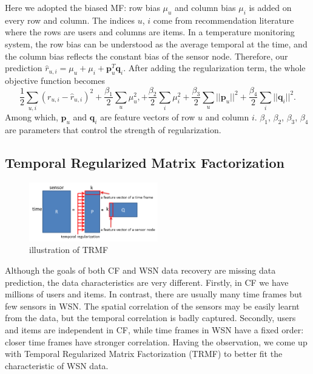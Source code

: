 Here we adopted the biased MF: row bias $\mu_u$ and column bias $\mu_i$ is added on every row and column. The indices $u$, $i$ come from recommendation literature where the rows are users and columns are items. In a temperature monitoring system, the row bias can be understood as the average temporal at the time, and the column bias reflects the constant bias of the sensor node. Therefore, our prediction $\hat{r}_{u,i} = \mu_u + \mu_i + \mathbf{p}_u^T \mathbf{q}_i$. After adding the regularization term, the whole objective function becomes
\begin{equation*} \frac{1}{2}\sum_{u,i}{(r_{u,i} - \hat{r}_{u,i})}^2 + \frac{\beta_1}{2}\sum_u{\mu_u^2}, + \frac{\beta_2}{2}\sum_i{\mu_i^2} + \frac{\beta_3}{2}\sum_u{||\mathbf{p}_u||^2} + \frac{\beta_4}{2}\sum_i{||\mathbf{q}_i||^2}.\end{equation*}
Among which, $\mathbf{p}_u$ and $\mathbf{q}_i$ are feature vectors of row $u$ and column $i$. $\beta_1$, $\beta_2$, $\beta_3$, $\beta_4$ are parameters that control the strength of regularization.

\subsection{Temporal Regularized Matrix Factorization}

\begin{figure}[htbp]
	\centering
	\includegraphics[width=0.5\textwidth]{TRMF_illustration.png}
	\caption{illustration of TRMF}
\end{figure}


Although the goals of both CF and WSN data recovery are missing data prediction, the data characteristics are very different. Firstly, in CF we have millions of users and items. In contrast, there are usually many time frames but few sensors in WSN. The spatial correlation of the sensors may be easily learnt from the data, but the temporal correlation is badly captured. Secondly, users and items are independent in CF, while time frames in WSN have a fixed order: closer time frames have stronger correlation. Having the observation, we come up with Temporal Regularized Matrix Factorization (TRMF) to better fit the characteristic of WSN data. 

